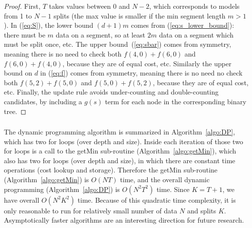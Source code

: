 \documentclass[algorithms,article,accept,oneauthor]{Definitions/mdpi}
\begin{document}
\begin{proof}
{First, $T$ takes values between 0 and $N-2$, which corresponds to models from 1 to $N-1$ splits (the max value is smaller if the min segment length $m>1$).
In (\ref{eq:S}), the lower bound $(d+1)m$ comes from (\ref{eq:s_lower_bound}): there must be $m$ data on a segment, so at least $2m$ data on a segment which must be split once, etc.
The upper bound~(\ref{eq:sbar}) comes from symmetry, meaning there is no need to check both $f(4,0)+f(6,0)$ and $f(6,0)+f(4,0)$, because they are of equal cost, etc.
Similarly the upper bound on $d$ in (\ref{eq:f}) comes from symmetry, meaning there is no need no check both $f(5,2)+f(5,0)$ and $f(5,0)+f(5,2)$, because they are of equal cost, etc.
Finally, the update rule avoids under-counting and double-counting candidates, by including a $g(s)$ term for each node in the corresponding binary tree.}
\end{proof}



\subsubsection*{} 
 
The dynamic programming algorithm is summarized in Algorithm~\ref{algo:DP}, which has two for loops (over depth and size). 
{Inside each iteration of those two for loops is a call to the getMin sub-routine (Algorithm~\ref{algo:getMin}), which also has two for loops (over depth and size), in which there are constant time operations (cost lookup and storage).
Therefore the getMin sub-routine (Algorithm~\ref{algo:getMin}) is $O(NT)$ time, and the overall dynamic programming (Algorithm~\ref{algo:DP}) is $O(N^2 T^2)$ time.
Since $K=T+1$, we have overall $O(N^2 K^2)$ time.
Because of this quadratic time complexity, it is only reasonable to run for relatively small number of data $N$ and splits $K$.
Asymptotically faster algorithms are an interesting direction for future research.}

\vspace{12pt}
\end{document}
